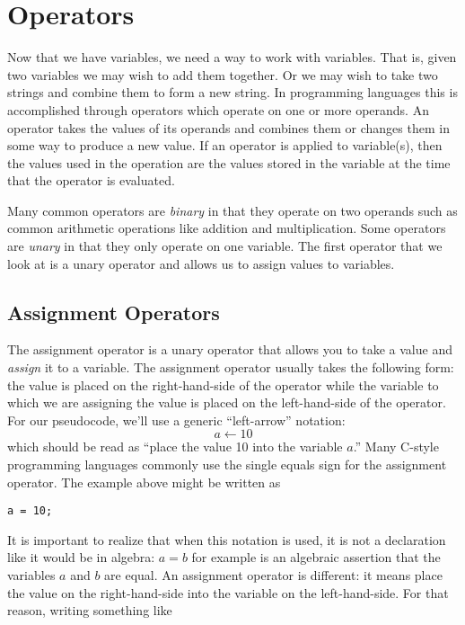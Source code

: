 \section{Operators}

Now that we have variables, we need a way to work with variables.  That is, 
given two variables we may wish to add them together.  Or we may wish
to take two strings and combine them to form a new string.  In programming
languages this is accomplished through \glspl{operator} which operate on
one or more \glspl{operand}.  An operator takes the values of its operands 
and combines them or changes them in some way to produce a new value.
If an operator is applied to variable(s), then the values used in the operation
are the values stored in the variable at the time that the operator is evaluated.

Many common operators are \emph{binary} in that they operate on two operands
such as common arithmetic operations like addition and multiplication.  Some
operators are \emph{unary} in that they only operate on one variable.  The
first operator that we look at is a unary operator and allows us to assign values 
to variables.

\subsection{Assignment Operators}

The \gls{assignment operator} is a unary operator that allows you to take a
value and \emph{assign} it to a variable.  The assignment operator usually takes
the following form: the value is placed on the right-hand-side of the operator
while the variable to which we are assigning the value is placed on the left-hand-side
of the operator.  For our pseudocode, we'll use a generic ``left-arrow'' notation:
  $$a \leftarrow 10$$
which should be read as ``place the value 10 into the variable $a$.''  Many C-style 
programming languages commonly use the single equals sign for the assignment 
operator.  The example above might be written as

\texttt{a = 10;}

It is important to realize that when this notation is used, it is not a declaration like 
it would be in algebra: $a = b$ for example is an algebraic assertion that the variables 
$a$ and $b$ are equal.  An assignment operator is different: it means place the value
on the right-hand-side into the variable on the left-hand-side.  For that reason, writing
something like 

